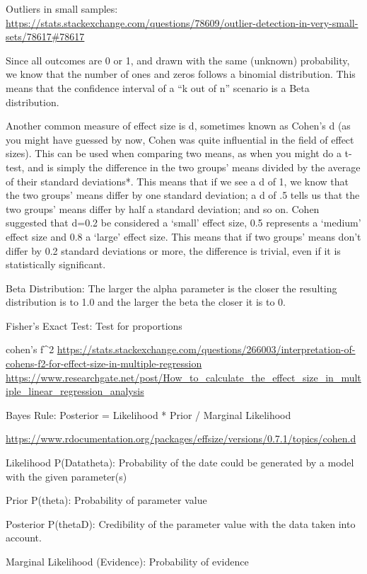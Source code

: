 \documentclass[]{book}
\begin{document}
Outliers in small samples:
\url{https://stats.stackexchange.com/questions/78609/outlier-detection-in-very-small-sets/78617\#78617}

Since all outcomes are 0 or 1, and drawn with the same (unknown)
probability, we know that the number of ones and zeros follows a
binomial distribution. This means that the confidence interval of a ``k
out of n'' scenario is a Beta distribution.

Another common measure of effect size is d, sometimes known as Cohen's d
(as you might have guessed by now, Cohen was quite influential in the
field of effect sizes). This can be used when comparing two means, as
when you might do a t-test, and is simply the difference in the two
groups' means divided by the average of their standard deviations*. This
means that if we see a d of 1, we know that the two groups' means differ
by one standard deviation; a d of .5 tells us that the two groups' means
differ by half a standard deviation; and so on. Cohen suggested that
d=0.2 be considered a `small' effect size, 0.5 represents a `medium'
effect size and 0.8 a `large' effect size. This means that if two
groups' means don't differ by 0.2 standard deviations or more, the
difference is trivial, even if it is statistically significant.

Beta Distribution: The larger the alpha parameter is the closer the
resulting distribution is to 1.0 and the larger the beta the closer it
is to 0.

Fisher's Exact Test: Test for proportions

cohen's f\^{}2 \textbar{}
\url{https://stats.stackexchange.com/questions/266003/interpretation-of-cohens-f2-for-effect-size-in-multiple-regression}
\textbar{}
\url{https://www.researchgate.net/post/How_to_calculate_the_effect_size_in_multiple_linear_regression_analysis}

Bayes Rule: Posterior = Likelihood * Prior / Marginal Likelihood

\url{https://www.rdocumentation.org/packages/effsize/versions/0.7.1/topics/cohen.d}

Likelihood P(Data\textbar{}theta): Probability of the date could be
generated by a model with the given parameter(s)

Prior P(theta): Probability of parameter value

Posterior P(theta\textbar{}D): Credibility of the parameter value with
the data taken into account.

Marginal Likelihood (Evidence): Probability of evidence
\end{document}
